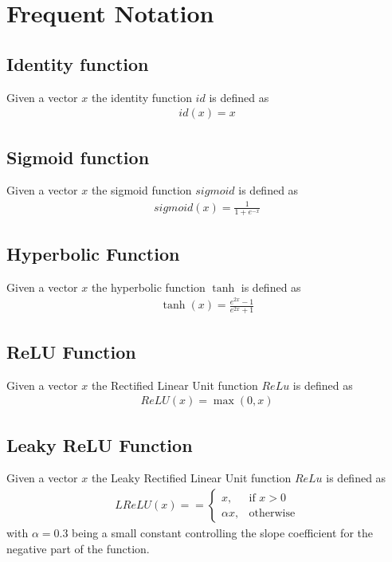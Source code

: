 \chapter{Frequent Notation}

\section{Identity function}
Given a vector $x$ the identity function $id$ is defined as 
\begin{gather}
    \label{identity}
    id(x) = x
\end{gather}

\section{Sigmoid function}
Given a vector $x$ the sigmoid function $sigmoid$ is defined as 
\begin{gather}
    \label{sigmoid}
    sigmoid(x) = \frac {1} {1 + e^{-x}}
\end{gather}

\section{Hyperbolic Function}
Given a vector $x$ the hyperbolic function $\tanh$ is defined as 
\begin{gather}
    \label{tanh}
    \tanh(x) = \frac {e^{2x} -1} {e^{2x} +1}
\end{gather}

\section{ReLU Function}
Given a vector $x$ the Rectified Linear Unit function $ReLu$ is defined as 
\begin{gather}
    \label{relu}
    ReLU(x) = \max(0, x)
\end{gather}

\section{Leaky ReLU Function}
Given a vector $x$ the Leaky Rectified Linear Unit function $ReLu$ is defined as 
\begin{gather}
    \label{lelu}
    LReLU(x) =  = 
    \begin{cases}
        x,& \text{if } x > 0 \\
        \alpha x,              & \text{otherwise}
    \end{cases}
\end{gather}
with $\alpha=0.3$ being a small constant controlling the slope coefficient for the negative part of the function.

